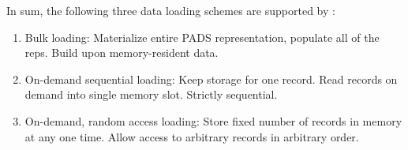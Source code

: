 {In sum, the following three data loading schemes are supported by \padx:

\begin{enumerate}
\item Bulk loading: Materialize entire PADS representation, populate all
  of the \pads reps. Build \padx \condm upon memory-resident data.

\item On-demand sequential loading: Keep storage for one record. Read
  records on demand into single memory slot. Strictly sequential.

\item On-demand, random access loading: Store fixed number of records in
  memory at any one time. Allow access to arbitrary records in
  arbitrary order.
\end{enumerate}
}